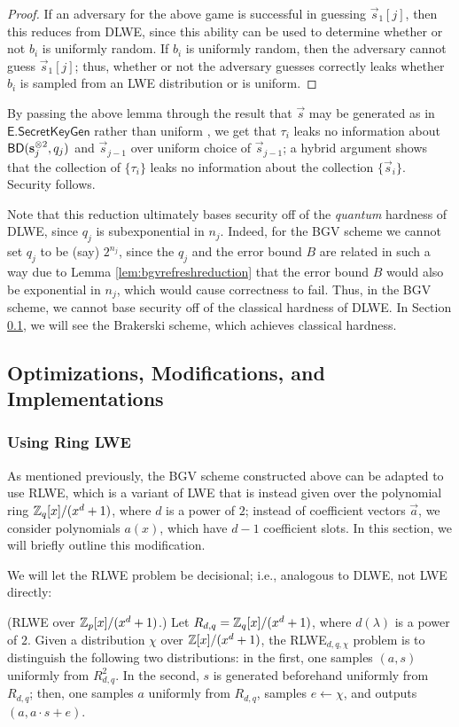 \begin{proof}
        If an adversary for the above game is successful in guessing $\vec{s}_1[j]$, then this reduces from DLWE, since this ability can be used to determine whether or not $b_i$ is uniformly random. If $b_i$ is uniformly random, then the adversary cannot guess $\vec{s}_1[j]$; thus, whether or not the adversary guesses correctly leaks whether $b_i$ is sampled from an LWE distribution or is uniform.

    \end{proof}

    By passing the above lemma through the result that $\vec{s}$ may be generated as in $\textsf{E.SecretKeyGen}$ rather than uniform \cite{Peikertsurvey}, we get that $\tau_i$ leaks no information about ${\sf BD}(\vec{s}_j^{\otimes 2}, q_j)$ and $\vec{s}_{j-1}$ over uniform choice of $\vec{s}_{j-1}$; a hybrid argument shows that the collection of $\{\tau_i\}$ leaks no information about the collection $\{\vec{s}_i\}$. Security follows.

    Note that this reduction ultimately bases security off of the \emph{quantum} hardness of DLWE, since $q_j$ is subexponential in $n_j$. Indeed, for the BGV scheme we cannot set $q_j$ to be (say) $2^{n_j}$, since the $q_j$ and the error bound $B$ are related in such a way due to Lemma \ref{lem:bgvrefreshreduction} that the error bound $B$ would also be exponential in $n_j$, which would cause correctness to fail. Thus, in the BGV scheme, we cannot base security off of the classical hardness of DLWE. In Section \ref{sec:bgvoptimizations}, we will see the Brakerski scheme, which achieves classical hardness.

    \subsection{Optimizations, Modifications, and Implementations} \label{sec:bgvoptimizations}


    \subsubsection{Using Ring LWE}
    As mentioned previously, the BGV scheme constructed above can be adapted to use RLWE, which is a variant of LWE that is instead given over the polynomial ring $\Z_q[x] / (x^d + 1)$, where $d$ is a power of $2$; instead of coefficient vectors $\vec{a}$, we consider polynomials $a(x)$, which have $d-1$ coefficient slots. In this section, we will briefly outline this modification.


    We will let the RLWE problem be decisional; i.e., analogous to DLWE, not LWE directly:
    \begin{definition} (RLWE over $\Z_p[x] / (x^d + 1)$.)
        Let $R_{d, q} = \Z_q[x] / (x^d + 1)$, where $d(\lambda)$ is a power of $2$. Given a distribution $\chi$ over $\Z[x] / (x^d + 1)$, the RLWE$_{d, q, \chi}$ problem is to distinguish the following two distributions: in the first, one samples $(a, s)$ uniformly from $R_{d, q}^2$. In the second, $s$ is generated beforehand uniformly from $R_{d, q}$; then, one samples $a$ uniformly from $R_{d, q}$, samples $e \leftarrow \chi$, and outputs $(a, a \cdot s + e)$.
    \end{definition}

